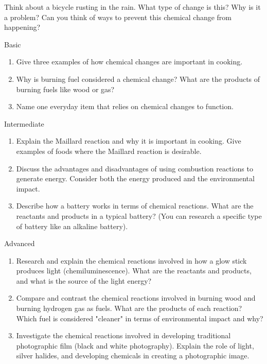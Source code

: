 \begin{stopandthink}
Think about a bicycle rusting in the rain.  What type of change is this? Why is it a problem? Can you think of ways to prevent this chemical change from happening?
\end{stopandthink}


\begin{tieredquestions}{Basic}
\begin{enumerate}
    \item Give three examples of how chemical changes are important in cooking.
    \item Why is burning fuel considered a chemical change? What are the products of burning fuels like wood or gas?
    \item Name one everyday item that relies on chemical changes to function.
\end{enumerate}
\end{tieredquestions}

\begin{tieredquestions}{Intermediate}
\begin{enumerate}
    \item Explain the Maillard reaction and why it is important in cooking. Give examples of foods where the Maillard reaction is desirable.
    \item Discuss the advantages and disadvantages of using combustion reactions to generate energy. Consider both the energy produced and the environmental impact.
    \item  Describe how a battery works in terms of chemical reactions. What are the reactants and products in a typical battery? (You can research a specific type of battery like an alkaline battery).
\end{enumerate}
\end{tieredquestions}

\begin{tieredquestions}{Advanced}
\begin{enumerate}
    \item Research and explain the chemical reactions involved in how a glow stick produces light (chemiluminescence). What are the reactants and products, and what is the source of the light energy?
    \item  Compare and contrast the chemical reactions involved in burning wood and burning hydrogen gas as fuels. What are the products of each reaction? Which fuel is considered "cleaner" in terms of environmental impact and why? 
    \item  Investigate the chemical reactions involved in developing traditional photographic film (black and white photography). Explain the role of light, silver halides, and developing chemicals in creating a photographic image.
\end{enumerate}
\end{tieredquestions}


